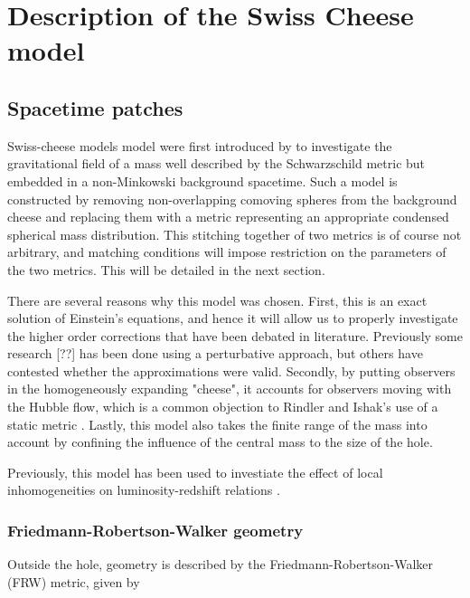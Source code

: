 \chapter{Description of the Swiss Cheese model}
\label{chapter:swiss-cheese}

\section{Spacetime patches}

Swiss-cheese models model were first introduced by \citet{einstein1945influence} to investigate the gravitational field of a mass well described by the Schwarzschild metric but embedded in a non-Minkowski background spacetime.  Such a model is constructed by removing non-overlapping comoving spheres from the background cheese and replacing them with a metric representing an appropriate condensed spherical mass distribution. This stitching together of two metrics is of course not arbitrary, and matching conditions will impose restriction on the parameters of the two metrics. This will be detailed in the next section. 

There are several reasons why this model was chosen. First, this is an exact solution of Einstein's equations, and hence it will allow us to properly investigate the higher order corrections that have been debated in literature. Previously some research \citep{simpson2010lensing}[??] has been done using a perturbative approach, but others \citep{ishak2010more} have contested whether the approximations were valid. Secondly, by putting observers in the homogeneously expanding "cheese", it accounts for observers moving with the Hubble flow, which is a common objection to Rindler and Ishak's use of a static metric \citep{simpson2010lensing,butcher2016no,park2008rigorous,khriplovich2008does}. Lastly, this model also takes the finite range of the mass into account by confining the influence of the central mass to the size of the hole. 

Previously, this model has been used to investiate the effect of local inhomogeneities on luminosity-redshift relations \citep{kantowski1969corrections,fleury2013interpretation}. 


\subsection{Friedmann-Robertson-Walker geometry}
Outside the hole, geometry is described by the Friedmann-Robertson-Walker (FRW) metric, given by

